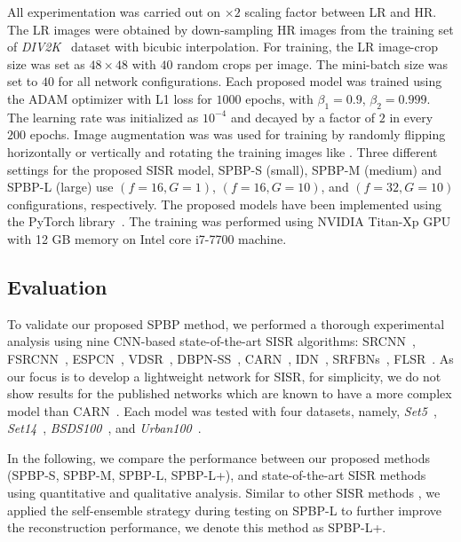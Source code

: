 \documentclass[a4paper,11pt]{article}
\begin{document}
All experimentation was carried out on $\times2$ scaling factor between LR and HR. The LR images were obtained by down-sampling HR images from the training set of \textit{DIV2K}~\cite{DIV2K} dataset with bicubic interpolation. For training, the LR image-crop size was set as $48\times48$ with $40$ random crops per image. The mini-batch size was set to $40$ for all network configurations. Each proposed model was trained using the ADAM optimizer with L1 loss for $1000$ epochs, with $\beta_{1} = 0.9$, $\beta_{2} = 0.999$. The learning rate was initialized as $10^{-4}$ and decayed by a factor of $2$ in every $200$ epochs. Image augmentation was was used for training by randomly flipping horizontally or vertically and rotating the training images like \cite{EDSR, SRFBN}. Three different settings for the proposed SISR model, SPBP-S (small), SPBP-M (medium) and SPBP-L (large) use $(f=16, G=1)$, $(f=16, G=10)$, and $(f=32, G=10)$ configurations, respectively. The proposed models have been implemented using the PyTorch library~\cite{paszke2017automatic}. The training was performed using NVIDIA Titan-Xp GPU with 12 GB memory on Intel core i7-7700 machine.

\subsection{Evaluation}

To validate our proposed SPBP method, we performed a thorough experimental analysis using nine CNN-based state-of-the-art SISR algorithms: SRCNN~\cite{SRCNN}, FSRCNN~\cite{FSRCNN}, ESPCN~\cite{ESPCN}, VDSR~\cite{VDSR}, DBPN-SS~\cite{DBPN}, CARN~\cite{CARN}, IDN~\cite{IDN}, SRFBNs~\cite{SRFBN}, FLSR~\cite{FLSR}. As our focus is to develop a lightweight network for SISR, for simplicity, we do not show results for the published networks which are known to have a more complex model than CARN~\cite{CARN}. Each model was tested with four datasets, namely, \textit{Set5}~\cite{Yang_image}, \textit{Set14}~\cite{set14}, \textit{BSDS100}~\cite{arbelaez2010contour}, and \textit{Urban100}~\cite{Urban}.




















In the following, we compare the performance between our proposed methods (SPBP-S, SPBP-M, SPBP-L, SPBP-L+), and state-of-the-art SISR methods using quantitative and qualitative analysis. Similar to other SISR methods \cite{EDSR, SRFBN, FLSR}, we applied the self-ensemble strategy during testing on SPBP-L to further improve the reconstruction performance, we denote this method as SPBP-L+.
\end{document}
